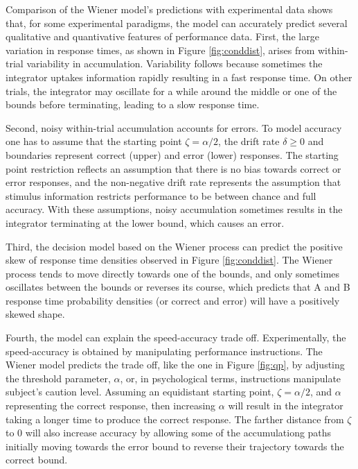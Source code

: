 \documentclass[12pt]{article}
\begin{document}
Comparison of the Wiener model's predictions with experimental data shows that, for some experimental paradigms, the model can accurately predict several qualitative and quantivative features of performance data. First, the large variation in response times, as shown in Figure \ref{fig:conddist}, arises from within-trial variability in accumulation. Variability follows because sometimes the integrator uptakes information rapidly resulting in a fast response time. On other trials, the integrator may oscillate for a while around the middle or one of the bounds before terminating, leading to a slow response time. 

Second, noisy within-trial accumulation accounts for errors. To model accuracy one has to assume that the starting point $\zeta = \alpha /2$, the drift rate $\delta \geq 0$ and boundaries represent correct (upper) and error (lower) responses. The starting point restriction reflects an assumption that there is no bias towards correct or error responses, and the non-negative drift rate represents the assumption that stimulus information  restricts performance to be between chance and full accuracy. With these assumptions,  noisy accumulation sometimes results in the integrator terminating at the lower bound, which causes an error. 

Third, the decision model based on the Wiener process can predict the positive skew of response time densities observed in Figure \ref{fig:conddist}. The Wiener process tends to move directly towards one of the bounds, and only sometimes oscillates between the bounds or reverses its course, which predicts that A and B response time probability densities (or correct and error) will have a positively skewed shape.

Fourth, the model can explain the speed-accuracy trade off. Experimentally, the speed-accuracy is obtained by manipulating performance instructions. The Wiener model predicts the trade off, like the one in Figure \ref{fig:qp}, by adjusting the threshold parameter, $\alpha$, or, in psychological terms, instructions manipulate subject's caution level. Assuming an equidistant starting point, $\zeta = \alpha /2$, and $\alpha$ representing the correct response, then increasing $\alpha$ will result in the integrator taking a longer time to produce the correct response. The farther distance from $\zeta$ to 0 will also increase accuracy by allowing some of the accumulationg paths initially moving towards the error bound to reverse their trajectory towards the correct bound.
\end{document}
